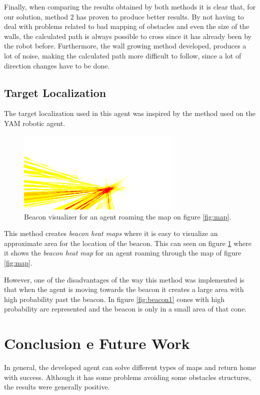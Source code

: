 \documentclass[oribibl]{llncs}
\begin{document}
Finally, when comparing the results obtained by both methods it is clear that, for our solution, method 2 has proven to produce better results. By not having to deal with problems related to bad mapping of obstacles and even the size of the walls, the calculated path is always possible to cross since it has already been by the robot before. Furthermore, the wall growing method developed, produces a lot of noise, making the calculated path more difficult to follow, since a lot of direction changes have to be done.


\subsection{Target Localization}
The target localization used in this agent was inspired by the method used on the
YAM robotic agent\cite{Ribeiro2002}.

\begin{figure}[ht]
  \centering
  \includegraphics[width=0.7\textwidth]{beacon-2.png}
  \caption{Beacon visualizer for an agent roaming the map on figure \ref{fig:map}.}
  \label{fig:beacon2}
\end{figure}

This method creates \textit{beacon heat maps} where it is easy to visualize an approximate
area for the location of the beacon. This can seen on figure \ref{fig:beacon2} where it shows
the \textit{beacon heat map} for an agent roaming through the map of figure \ref{fig:map}.

However, one of the disadvantages of the way this method was implemented is that when the agent
is moving towards the beacon it creates a large area with high probability past the beacon.
In figure \ref{fig:beacon1} cones with high probability are represented and the beacon is only in a small area of that cone.


\section{Conclusion e Future Work}
In general, the developed agent can solve different types of maps and return home with success. Although it has some problems avoiding some obstacles structures, the results were generally positive.
\end{document}
